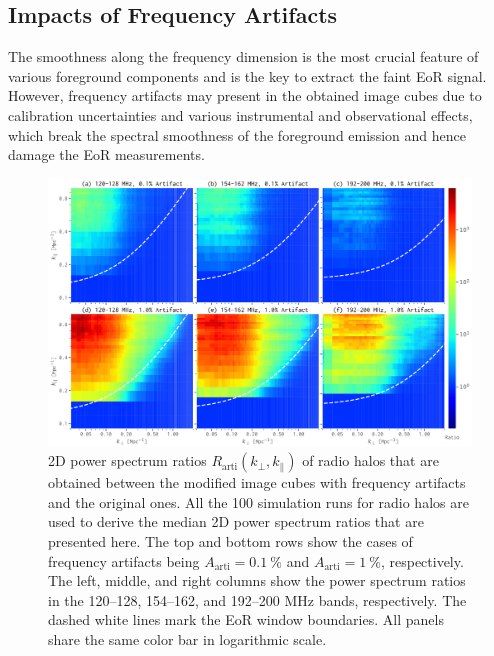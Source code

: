 \documentclass[modern]{aastex62}
\newcommand{\R}[1]{\mathrm{#1}}
\newcommand{\klos}{\text{$k_{\parallel}$}}
\newcommand{\kperp}{\text{$k_{\bot}$}}
\begin{document}
\subsection{Impacts of Frequency Artifacts}
\label{sec:freq-artifacts}

The smoothness along the frequency dimension is the most crucial feature
of various foreground components and is the key to extract the faint EoR
signal.
However, frequency artifacts may present in the obtained image cubes due
to calibration uncertainties and various instrumental and observational
effects, which break the spectral smoothness of the foreground emission
and hence damage the EoR measurements.

\begin{figure}
  \centering
  \includegraphics[width=\textwidth]{ps2d-ratio-crp-halos-3bands}
  \caption{\label{fig:ps2d-ratio-crp}%
    2D power spectrum ratios $R_{\R{arti}}(\kperp, \klos)$ of radio
    halos that are obtained between the modified image cubes with
    frequency artifacts and the original ones.
    All the 100 simulation runs for radio halos are used to derive
    the median 2D power spectrum ratios that are presented here.
    The top and bottom rows show the cases of frequency artifacts
    being $A_{\R{arti}} = \SI{0.1}{\percent}$ and
    $A_{\R{arti}} = \SI{1}{\percent}$, respectively.
    The left, middle, and right columns show the power spectrum ratios
    in the \numrange{120}{128}, \numrange{154}{162}, and
    \numrange{192}{200} \si{\MHz} bands, respectively.
    The dashed white lines mark the EoR window boundaries.
    All panels share the same color bar in logarithmic scale.
  }
\end{figure}
\end{document}
